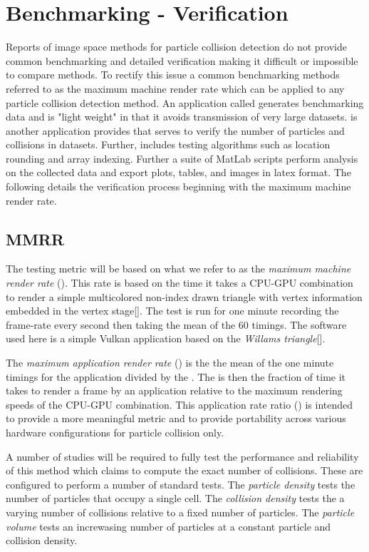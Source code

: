 \section{Benchmarking - Verification} \label{benchver}

Reports of image space methods for particle collision detection do not provide common benchmarking and detailed verification making it difficult or impossible to compare methods. To rectify this issue a common benchmarking methods referred to as the maximum machine render rate which can be applied to any particle collision detection method. An application called \gen{} generates benchmarking data and is "light weight" in that it avoids transmission of very large datasets. \ver{} is another application provides that serves to verify the number of particles and collisions in datasets. Further, \ver{} includes testing algorithms such as location rounding and array indexing. Further a suite of MatLab scripts perform analysis on the collected data and export plots, tables, and images in latex format. The following details the verification process beginning with the maximum machine render rate. 

\subsection{MMRR}

The testing metric will be based on what we refer to as the \textit{maximum machine render rate} (\mmrr{}). This rate is based on the time it takes a CPU-GPU combination to render a simple multicolored non-index drawn triangle with vertex information embedded in the vertex stage[]. The test is run for one minute recording the frame-rate every second then taking the mean of the 60 timings. The \mmrr{} software used here is a simple Vulkan application based on the \textit{Willams triangle}[].

The \textit{maximum application render rate} (\marr{}) is the the mean of the one minute timings for the application divided by the \mmrr{}. The \marr{} is then the fraction of time it takes to render a frame by an application relative to the maximum rendering speeds of the CPU-GPU combination. This application rate ratio (\arr{}) is intended to provide a more meaningful metric and to provide portability across various hardware configurations for particle collision only.

A number of studies will be required to fully test the performance and reliability of this method which claims to compute the exact number of collisions. These are configured to perform a number of standard tests. The \textit{particle density} tests the number of particles that occupy a single cell. The \textit{collision density} tests the a varying number of collisions relative to a fixed number of particles. The \textit{particle volume} tests an increwasing number of particles at a constant particle and collision density.

